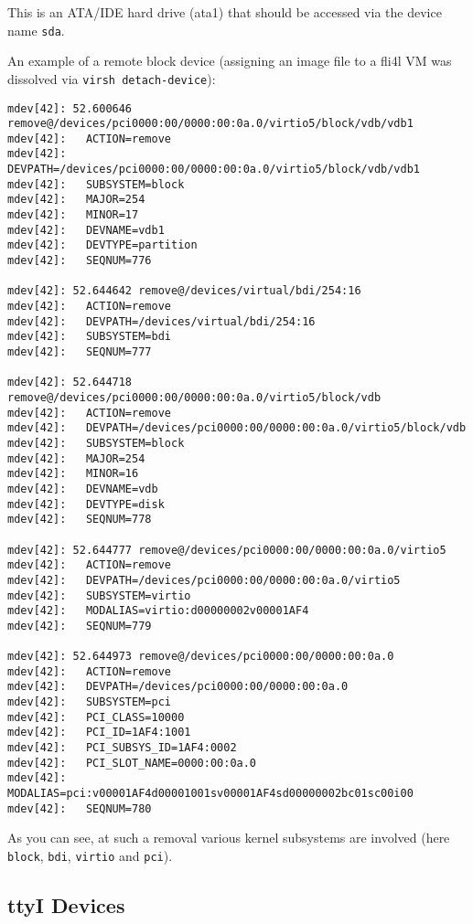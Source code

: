 This is an ATA/IDE hard drive (ata1) that should be accessed via the device name
\texttt{sda}.

An example of a remote block device (assigning an image file to
a fli4l VM was dissolved via \texttt{virsh detach-device}):

\begin{scriptsize}
\begin{verbatim}
mdev[42]: 52.600646 remove@/devices/pci0000:00/0000:00:0a.0/virtio5/block/vdb/vdb1
mdev[42]:   ACTION=remove
mdev[42]:   DEVPATH=/devices/pci0000:00/0000:00:0a.0/virtio5/block/vdb/vdb1
mdev[42]:   SUBSYSTEM=block
mdev[42]:   MAJOR=254
mdev[42]:   MINOR=17
mdev[42]:   DEVNAME=vdb1
mdev[42]:   DEVTYPE=partition
mdev[42]:   SEQNUM=776

mdev[42]: 52.644642 remove@/devices/virtual/bdi/254:16
mdev[42]:   ACTION=remove
mdev[42]:   DEVPATH=/devices/virtual/bdi/254:16
mdev[42]:   SUBSYSTEM=bdi
mdev[42]:   SEQNUM=777

mdev[42]: 52.644718 remove@/devices/pci0000:00/0000:00:0a.0/virtio5/block/vdb
mdev[42]:   ACTION=remove
mdev[42]:   DEVPATH=/devices/pci0000:00/0000:00:0a.0/virtio5/block/vdb
mdev[42]:   SUBSYSTEM=block
mdev[42]:   MAJOR=254
mdev[42]:   MINOR=16
mdev[42]:   DEVNAME=vdb
mdev[42]:   DEVTYPE=disk
mdev[42]:   SEQNUM=778

mdev[42]: 52.644777 remove@/devices/pci0000:00/0000:00:0a.0/virtio5
mdev[42]:   ACTION=remove
mdev[42]:   DEVPATH=/devices/pci0000:00/0000:00:0a.0/virtio5
mdev[42]:   SUBSYSTEM=virtio
mdev[42]:   MODALIAS=virtio:d00000002v00001AF4
mdev[42]:   SEQNUM=779

mdev[42]: 52.644973 remove@/devices/pci0000:00/0000:00:0a.0
mdev[42]:   ACTION=remove
mdev[42]:   DEVPATH=/devices/pci0000:00/0000:00:0a.0
mdev[42]:   SUBSYSTEM=pci
mdev[42]:   PCI_CLASS=10000
mdev[42]:   PCI_ID=1AF4:1001
mdev[42]:   PCI_SUBSYS_ID=1AF4:0002
mdev[42]:   PCI_SLOT_NAME=0000:00:0a.0
mdev[42]:   MODALIAS=pci:v00001AF4d00001001sv00001AF4sd00000002bc01sc00i00
mdev[42]:   SEQNUM=780
\end{verbatim}
\end{scriptsize}

As you can see, at such a removal various kernel subsystems are 
involved (here \texttt{block}, \texttt{bdi}, \texttt{virtio} and
\texttt{pci}).

\subsection{ttyI Devices}

